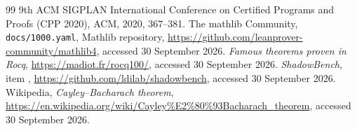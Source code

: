 \documentclass[11pt]{article}
\theoremstyle{definition}
\theoremstyle{remark}
\begin{document}
\begin{thebibliography}{99}
{9th ACM SIGPLAN International Conference on Certified Programs and Proofs (CPP 2020)}, ACM, 2020,
367--381.
 The mathlib Community, \texttt{docs/1000.yaml}, Mathlib repository,
\url{https://github.com/leanprover-community/mathlib4}, accessed 30 September 2026.
 \emph{Famous theorems proven in Rocq}, \url{https://madiot.fr/rocq100/}, accessed
30 September 2026.
 \emph{ShadowBench}, item
, \url{https://github.com/ldilab/shadowbench},
accessed 30 September 2026.
 Wikipedia, \emph{Cayley--Bacharach theorem},
\url{https://en.wikipedia.org/wiki/Cayley\%E2\%80\%93Bacharach_theorem}, accessed 30 September
2026.
\end{thebibliography}
\end{document}
